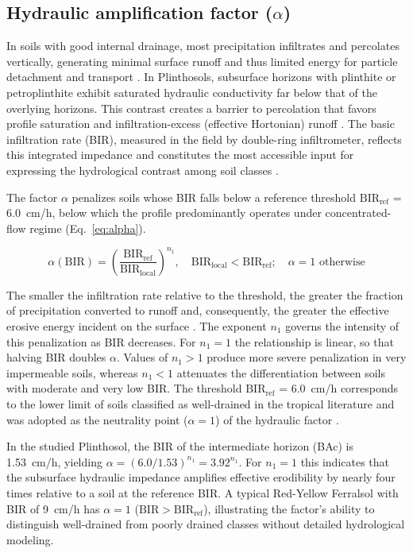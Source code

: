 \documentclass[preprint,review,12pt,authoryear]{elsarticle}
\begin{document}
\subsection{Hydraulic amplification factor ($\alpha$)}

In soils with good internal drainage, most precipitation infiltrates and percolates vertically, generating minimal surface runoff and thus limited energy for particle detachment and transport \citep{deroo_1992}. In Plinthosols, subsurface horizons with plinthite or petroplinthite exhibit saturated hydraulic conductivity far below that of the overlying horizons. This contrast creates a barrier to percolation that favors profile saturation and infiltration-excess (effective Hortonian) runoff \citep{padmanabhan_2005}. The basic infiltration rate (BIR), measured in the field by double-ring infiltrometer, reflects this integrated impedance and constitutes the most accessible input for expressing the hydrological contrast among soil classes \citep{bertoni_lombardi_neto_2017}.

The factor $\alpha$ penalizes soils whose BIR falls below a reference threshold $\mathrm{BIR_{ref}}$ = 6.0~cm/h, below which the profile predominantly operates under concentrated-flow regime (Eq.~\ref{eq:alpha}).

\begin{equation}
\alpha(\mathrm{BIR}) = \left(\frac{\mathrm{BIR_{ref}}}{\mathrm{BIR_{local}}}\right)^{n_1}, \quad \mathrm{BIR_{local}} < \mathrm{BIR_{ref}}; \quad \alpha = 1 \text{ otherwise}
\label{eq:alpha}
\end{equation}

The smaller the infiltration rate relative to the threshold, the greater the fraction of precipitation converted to runoff and, consequently, the greater the effective erosive energy incident on the surface \citep{kinnell_2005}. The exponent $n_1$ governs the intensity of this penalization as BIR decreases. For $n_1 = 1$ the relationship is linear, so that halving BIR doubles $\alpha$. Values of $n_1 > 1$ produce more severe penalization in very impermeable soils, whereas $n_1 < 1$ attenuates the differentiation between soils with moderate and very low BIR. The threshold $\mathrm{BIR_{ref}}$ = 6.0~cm/h corresponds to the lower limit of soils classified as well-drained in the tropical literature and was adopted as the neutrality point ($\alpha = 1$) of the hydraulic factor \citep{embrapa_2018}.

In the studied Plinthosol, the BIR of the intermediate horizon (BAc) is 1.53~cm/h, yielding $\alpha = (6.0/1.53)^{n_1} = 3.92^{n_1}$. For $n_1 = 1$ this indicates that the subsurface hydraulic impedance amplifies effective erodibility by nearly four times relative to a soil at the reference BIR. A typical Red-Yellow Ferralsol with BIR of 9~cm/h has $\alpha = 1$ ($\mathrm{BIR} > \mathrm{BIR_{ref}}$), illustrating the factor's ability to distinguish well-drained from poorly drained classes without detailed hydrological modeling.
\end{document}
